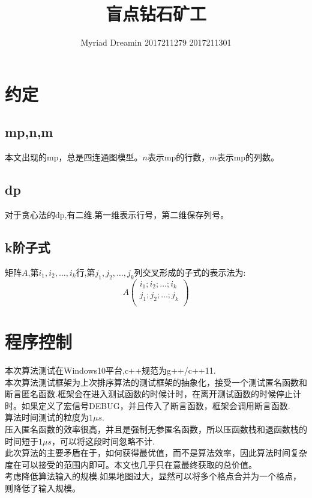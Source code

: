 \documentclass[UTF8]{ctexart}
\title{盲点钻石矿工}
\author{Myriad Dreamin 2017211279 2017211301}
\date{}
\newcommand{\fira}[1]{{\firacode {}#1}}
\begin{document}
\setlength{\parindent}{2em}
\setlength{\baselineskip}{2.5em}
\maketitle
\tableofcontents

\newpage

\section{约定}
\subsection{mp,n,m}
本文出现的$\mathrm{mp}$，总是四连通图模型。$n$表示$\mathrm{mp}$的行数，$m$表示$\mathrm{mp}$的列数。

\subsection{dp}
对于贪心法的dp,有二维.第一维表示行号，第二维保存列号。

\subsection{k阶子式}
矩阵$A$,第$i_1,i_2,\dots, i_k$行,第$j_1,j_2,\dots, j_k$列交叉形成的子式的表示法为:
$$
    A\begin{pmatrix}
        i_1;i_2;\dots; i_k\\
        j_1;j_2;\dots; j_k\\
    \end{pmatrix}
$$
\section{程序控制}
本次算法测试在Windows10平台,c++规范为g++/c++11.\\
\indent 本次算法测试框架为上次排序算法的测试框架的抽象化，接受一个测试匿名函数和断言匿名函数.框架会在进入测试函数的时候计时，在离开测试函数的时候停止计时。如果定义了宏信号\fira{DEBUG}，并且传入了断言函数，框架会调用断言函数.\\
\indent 算法时间测试的粒度为$1\mu s$.\\
\indent 压入匿名函数的效率很高，并且是强制无参匿名函数，所以压函数栈和退函数栈的时间短于$1\mu s$，可以将这段时间忽略不计.\\
\indent 此次算法的主要矛盾在于，如何获得最优值，而不是算法效率，因此算法时间复杂度在可以接受的范围内即可。本文也几乎只在意最终获取的总价值。\\
\indent 考虑降低算法输入的规模.如果地图过大，显然可以将多个格点合并为一个格点，则降低了输入规模。 
\end{document}
